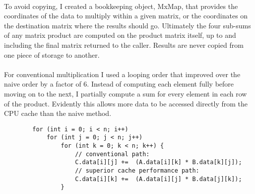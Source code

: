 \documentclass[11pt]{article}
\begin{document}
\\
To avoid copying, I created a bookkeeping object, MxMap, that provides the coordinates of the data to multiply within a given matrix, or the coordinates on the destination matrix where the results should go. Ultimately the four sub-sums of any matrix product are computed on the product matrix itself, up to and including the final matrix returned to the caller. Results are never copied from one piece of storage to another.
\\
\\
For conventional multiplication I used a looping order that improved over the naive order by a factor of 6. Instead of computing each element fully before moving on to the next, I partially compute a sum for every element in each row of the product. Evidently this allows more data to be accessed directly from the CPU cache than the naive method. \\
\begin{verbatim}
        for (int i = 0; i < n; i++)
            for (int j = 0; j < n; j++)
                for (int k = 0; k < n; k++) {
                    // conventional path:
                    C.data[i][j] +=  (A.data[i][k] * B.data[k][j]);
                    // superior cache performance path:
                    C.data[i][k] +=  (A.data[i][j] * B.data[j][k]);
                }               
\end{verbatim}
\end{document}
